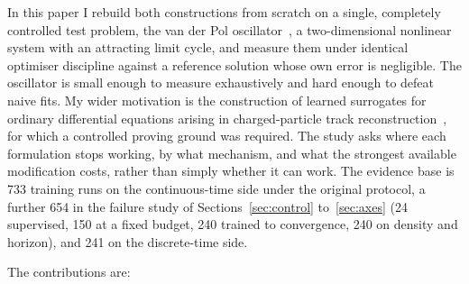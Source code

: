 \documentclass[11pt,a4paper]{article}
\begin{document}
In this paper I rebuild both constructions from scratch on a single,
completely controlled test problem, the van der Pol
oscillator~\cite{vanderpol1926}, a two-dimensional nonlinear system with an
attracting limit cycle, and measure them under identical optimiser
discipline against a reference solution whose own error is negligible. The
oscillator is small enough to measure exhaustively and hard enough to
defeat naive fits. My wider motivation is the construction of learned
surrogates for ordinary differential equations arising in charged-particle
track reconstruction~\cite{aaij2020}, for which a controlled proving ground
was required. The study asks where each formulation stops working, by what
mechanism, and what the strongest available modification costs, rather
than simply whether it can work. The evidence base is 733 training runs on the continuous-time side under the original protocol, a further 654 in the failure study of Sections~\ref{sec:control} to~\ref{sec:axes} (24 supervised, 150 at a fixed budget, 240 trained to convergence, 240 on density and horizon), and 241 on the discrete-time side.

The contributions are:
\end{document}
